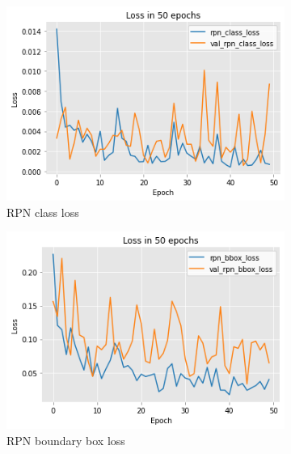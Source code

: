 \documentclass[../Head/Main.tex]{subfiles}
\begin{document}
\begin{figure}[H]
    \centering
    \begin{subfigure}[t]{.32\textwidth}
        \centering
        \includegraphics[width=\textwidth]{../Figures/rcnn_results/loss/plot_smalldata2.png}
        \caption{RPN class loss}
        \label{fig:RPN_class_loss_smalldata}
    \end{subfigure}
    \hfill
    \begin{subfigure}[t]{.32\textwidth}
        \centering
        \includegraphics[width=\textwidth]{../Figures/rcnn_results/loss/plot_smalldata3.png}
        \caption{RPN boundary box loss}
        \label{fig:RPN_bbox_loss_smalldata}
    \end{subfigure}
    \hfill
    \begin{subfigure}[t]{.32\textwidth}

\end{subfigure}
\end{figure}
\end{document}
